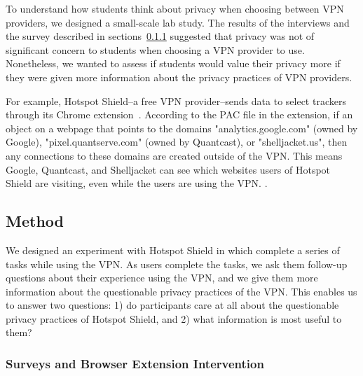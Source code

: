 
To understand how students think about privacy when choosing between VPN
providers, we designed a small-scale lab study.  The results of the interviews
and the survey described in sections~\ref{} suggested that privacy was not of
significant concern to students when choosing a VPN provider to use.
Nonetheless, we wanted to assess if students would value their privacy more if
they were given more information about the privacy practices of VPN providers.

For example, Hotspot Shield--a free VPN
provider--sends data to select trackers through its Chrome
extension~\cite{windscribe-hotspot-shield}.  According to the PAC  file in the extension, if an object on a webpage that points to the
domains "analytics.google.com" (owned by Google), "pixel.quantserve.com"
(owned by Quantcast), or "shelljacket.us", then any connections to these
domains are created outside of the VPN.    This means Google, Quantcast, and Shelljacket can see which
websites users of Hotspot Shield are visiting, even while the users are using
the VPN. .

\subsection{Method}\label{sec:experiment_method}

We designed an experiment with Hotspot Shield in which complete a series of tasks while using the VPN. As users complete the tasks, we ask them follow-up questions about their experience using the VPN, and we give them more information about the questionable privacy practices of the VPN. This enables us to answer two questions: 1) do participants care at all about the questionable privacy practices of Hotspot Shield, and 2) what information is most useful to them?

\subsubsection{Surveys and Browser Extension Intervention}

